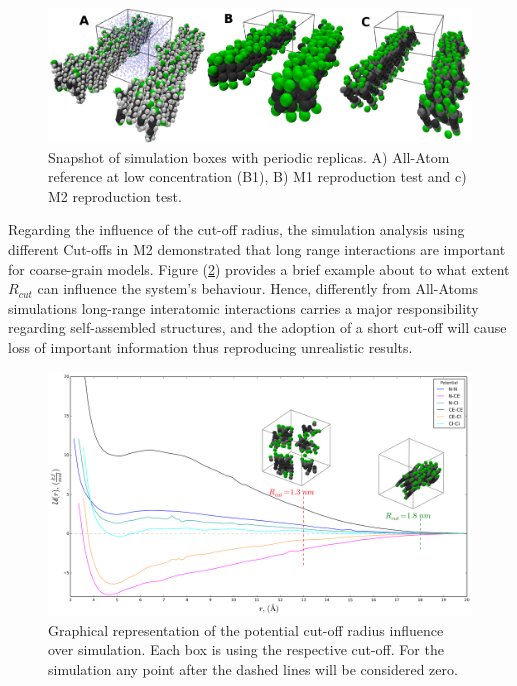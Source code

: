 \documentclass[10pt,a4paper,twoside]{article}
\begin{document}
   

     \begin{figure}[ht!]
  \begin{center}
	\includegraphics[width=1 \textwidth]{./images/M1M2box}
	\caption{Snapshot of simulation boxes with periodic replicas. A) All-Atom reference at low concentration (B1), B) M1 reproduction test and c) M2 reproduction test.}
	\label{Fig:M1M2box}
  \end{center}
\end{figure}

Regarding the influence of the cut-off radius, the simulation analysis using different Cut-offs in M2 demonstrated that long range interactions are important for coarse-grain models. Figure (\ref{Fig:M2cut}) provides a brief example about to what extent  $R_{cut}$ can influence the system's behaviour. Hence, differently from All-Atoms simulations long-range interatomic interactions carries a major responsibility regarding self-assembled structures, and the adoption of a short cut-off will cause loss of important information thus reproducing unrealistic results.

 \begin{figure}[H]
  \begin{center}
	\includegraphics[width=1 \textwidth]{./images/M2cut}
	\caption{Graphical representation of the potential cut-off radius influence over simulation. Each box is using the respective cut-off. For the simulation any point after the dashed lines will be considered zero. }
	\label{Fig:M2cut}
  \end{center}
\end{figure}
\end{document}
